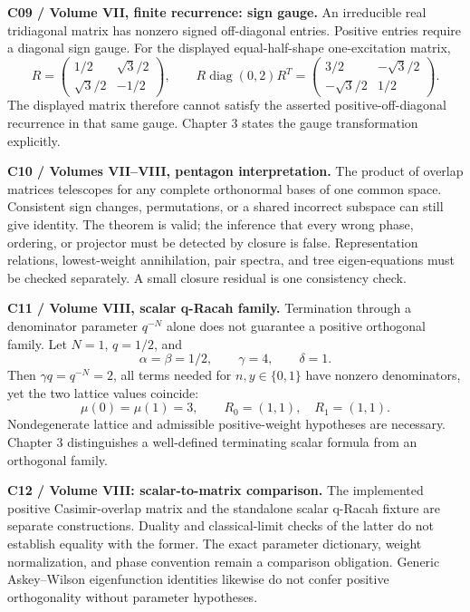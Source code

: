 \textbf{C09 / Volume VII, finite recurrence: sign gauge.}
An irreducible real tridiagonal matrix has nonzero signed off-diagonal entries. Positive entries require a diagonal sign gauge. For the displayed equal-half-shape one-excitation matrix,
\[
R=\begin{pmatrix}1/2&\sqrt3/2\\\sqrt3/2&-1/2\end{pmatrix},
\qquad R\operatorname{diag}(0,2)R^T
=\begin{pmatrix}3/2&-\sqrt3/2\\-\sqrt3/2&1/2\end{pmatrix}.
\]
The displayed matrix therefore cannot satisfy the asserted positive-off-diagonal recurrence in that same gauge. Chapter 3 states the gauge transformation explicitly.

\textbf{C10 / Volumes VII--VIII, pentagon interpretation.}
The product of overlap matrices telescopes for any complete orthonormal bases of one common space. Consistent sign changes, permutations, or a shared incorrect subspace can still give identity. The theorem is valid; the inference that every wrong phase, ordering, or projector must be detected by closure is false. Representation relations, lowest-weight annihilation, pair spectra, and tree eigen-equations must be checked separately. A small closure residual is one consistency check.

\textbf{C11 / Volume VIII, scalar q-Racah family.}
Termination through a denominator parameter $q^{-N}$ alone does not guarantee a positive orthogonal family. Let $N=1$, $q=1/2$, and
\[
\alpha=\beta=1/2,\qquad\gamma=4,\qquad\delta=1.
\]
Then $\gamma q=q^{-N}=2$, all terms needed for $n,y\in\{0,1\}$ have nonzero denominators, yet the two lattice values coincide:
\[
\mu(0)=\mu(1)=3,\qquad R_0=(1,1),\quad R_1=(1,1).
\]
Nondegenerate lattice and admissible positive-weight hypotheses are necessary. Chapter 3 distinguishes a well-defined terminating scalar formula from an orthogonal family.

\textbf{C12 / Volume VIII: scalar-to-matrix comparison.}
The implemented positive Casimir-overlap matrix and the standalone scalar q-Racah fixture are separate constructions. Duality and classical-limit checks of the latter do not establish equality with the former. The exact parameter dictionary, weight normalization, and phase convention remain a comparison obligation. Generic Askey--Wilson eigenfunction identities likewise do not confer positive orthogonality without parameter hypotheses.

